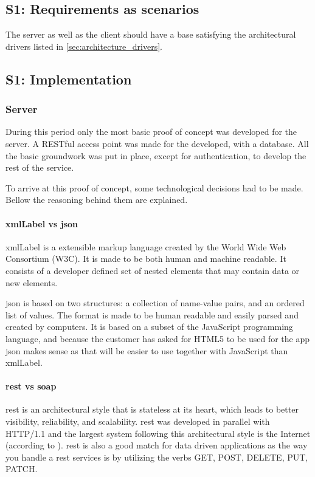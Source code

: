 \documentclass[11pt]{book}
\begin{document}
\subsection{S1: Requirements as scenarios}
The server as well as the client should have a base satisfying the architectural drivers listed in \ref{sec:architecture_drivers}.

\subsection{S1: Implementation}

\subsubsection{Server}
During this period only the most basic proof of concept was developed for the server. A RESTful access point was made for the developed, with a database. All the basic groundwork was put in place, except for authentication, to develop the rest of the service.

To arrive at this proof of concept, some technological decisions had to be made. Bellow the reasoning behind them are explained.

\paragraph{\gls{xmlLabel} vs \gls{json}}
\gls{xmlLabel} is a extensible markup language created by the World Wide Web Consortium (W3C). It is made to be both human and machine readable. It consists of a developer defined set of nested elements that may contain data or new elements.

\gls{json} \cite{json} is based on two structures: a collection of name-value pairs, and an ordered list of values. The format is made to be human readable and easily parsed and created by computers. It is based on a subset of the JavaScript programming language, and because the customer has asked for HTML5 to be used for the app \gls{json} makes sense as that will be easier to use together with JavaScript than \gls{xmlLabel}.

\paragraph{\gls{rest} vs \gls{soap}}
\gls{rest} \cite{rest} is an architectural style that is stateless at its heart, which leads to better visibility, reliability, and scalability. \gls{rest} was developed in parallel with HTTP/1.1 and the largest system following this architectural style is the Internet (according to \cite{wikipedia:rest}). \gls{rest} is also a good match for data driven applications as the way you handle a \gls{rest} services is by utilizing the verbs GET, POST, DELETE, PUT, PATCH.
\end{document}
